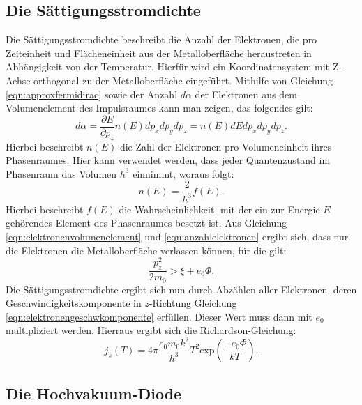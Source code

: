 \subsection{Die Sättigungsstromdichte}
Die Sättigungsstromdichte beschreibt die Anzahl der Elektronen, die pro Zeiteinheit
und Flächeneinheit aus der Metalloberfläche heraustreten in Abhängigkeit von
der Temperatur. Hierfür wird ein Koordinatensystem mit Z-Achse orthogonal zu der
Metalloberfläche eingeführt. Mithilfe von Gleichung \eqref{eqn:approxfermidirac}
sowie der Anzahl $d\alpha$ der Elektronen aus dem Volumenelement des Impulsraumes
kann man zeigen, das folgendes gilt:
\begin{equation}
    d\alpha = \frac{\partial E}{\partial p_z} n(E) dp_x dp_y
    dp_z = n(E) dE dp_x dp_y dp_z.
    \label{eqn:elektronenvolumenelement}
\end{equation}
Hierbei beschreibt $n(E)$ die Zahl der Elektronen pro Volumeneinheit ihres
Phasenraumes. Hier kann verwendet werden, dass jeder Quantenzustand im Phasenraum
das Volumen $h^3$ einnimmt, woraus folgt:
\begin{equation}
    n(E) = \frac{2}{h^3}f(E).
    \label{eqn:anzahlelektronen}
\end{equation}
Hierbei beschreibt $f(E)$ die Wahrscheinlichkeit, mit der ein zur Energie $E$
gehörendes Element des Phasenraumes besetzt ist.
Aus Gleichung \eqref{eqn:elektronenvolumenelement} und \eqref{eqn:anzahlelektronen}
ergibt sich, dass nur die Elektronen die Metalloberfläche verlassen können, für
die gilt:
\begin{equation}
    \frac{p_z^2}{2 m_0} > \xi + e_0 \Phi.
    \label{eqn:elektronengeschwkomponente}
\end{equation}
Die Sättigungsstromdichte ergibt sich nun durch Abzählen aller Elektronen,
deren Geschwindigkeitskomponente in $z$-Richtung Gleichung
\eqref{eqn:elektronengeschwkomponente} erfüllen. Dieser Wert muss dann mit $e_0$
multipliziert werden. Hierraus ergibt sich die Richardson-Gleichung:
\begin{equation}
    j_s(T) = 4 \pi \frac{e_0 m_0 k^2}{h^3}T^2 \text{exp}\left(\frac{-e_0 \Phi}{k T}\right).
    \label{eqn:richardson}
\end{equation}

\subsection{Die Hochvakuum-Diode}
